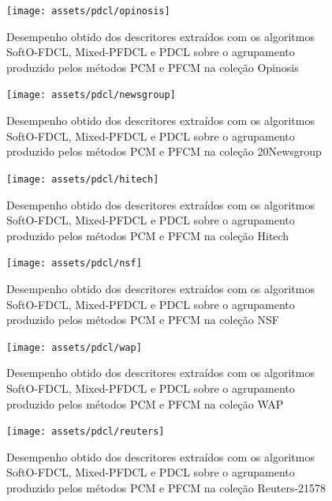 \begin{figure}[!h] \centering 
   \begin{minipage}{0.48\textwidth} 
     \centering
    \texttt{[image: assets/pdcl/opinosis]} 
    \caption{Desempenho obtido dos descritores extraídos com os algoritmos SoftO-FDCL, Mixed-PFDCL e
    PDCL sobre o agrupamento produzido pelos métodos PCM e PFCM na coleção Opinosis} 
  \label{fig:pdclopinosis}
  \end{minipage}\hfill 
  \begin{minipage}{0.48\textwidth} \centering
    \texttt{[image: assets/pdcl/newsgroup]} 
    \caption{Desempenho obtido dos descritores extraídos com os algoritmos SoftO-FDCL, Mixed-PFDCL e
    PDCL sobre o agrupamento produzido pelos métodos PCM e PFCM na coleção 20Newsgroup} 
     \label{fig:pdcl20news} 
   \end{minipage} 
\end{figure}

\begin{figure}[!h] \centering 
   \begin{minipage}{0.48\textwidth} 
     \centering
    \texttt{[image: assets/pdcl/hitech]} 
    \caption{Desempenho obtido dos descritores extraídos com os algoritmos SoftO-FDCL, Mixed-PFDCL e
    PDCL sobre o agrupamento produzido pelos métodos PCM e PFCM na coleção Hitech} 
  \label{fig:pdclhitech}
  \end{minipage}\hfill 
  \begin{minipage}{0.48\textwidth} \centering
    \texttt{[image: assets/pdcl/nsf]} 
    \caption{Desempenho obtido dos descritores extraídos com os algoritmos SoftO-FDCL, Mixed-PFDCL e
    PDCL sobre o agrupamento produzido pelos métodos PCM e PFCM na coleção NSF} 
     \label{fig:pdclnsf} 
   \end{minipage} 
\end{figure}

\begin{figure}[!h] \centering 
   \begin{minipage}{0.48\textwidth} 
     \centering
    \texttt{[image: assets/pdcl/wap]} 
    \caption{Desempenho obtido dos descritores extraídos com os algoritmos SoftO-FDCL, Mixed-PFDCL e
    PDCL sobre o agrupamento produzido pelos métodos PCM e PFCM na coleção WAP} 
    \label{fig:pdclwap}
  \end{minipage}\hfill 
  \begin{minipage}{0.48\textwidth} \centering
    \texttt{[image: assets/pdcl/reuters]} 
    \caption{Desempenho obtido dos descritores extraídos com os algoritmos SoftO-FDCL, Mixed-PFDCL e
    PDCL sobre o agrupamento produzido pelos métodos PCM e PFCM na coleção Reuters-21578} 
     \label{fig:pdclreuters} 
   \end{minipage} 
\end{figure}


